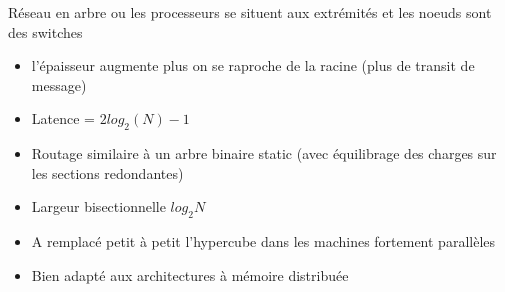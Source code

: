 \documentclass[12pt,a4paper,oneside, titlepage]{article}
\begin{document}
      Réseau en arbre ou les processeurs se situent aux extrémités et les noeuds sont des switches

      \begin{itemize}
        \item l'épaisseur augmente plus on se raproche de la racine (plus de transit de message)
        \item Latence = $2 log_2(N) - 1$
        \item Routage similaire à un arbre binaire static (avec équilibrage des charges sur les sections redondantes)
        \item Largeur bisectionnelle $log_2 N$
        \item A remplacé petit à petit l'hypercube dans les machines fortement parallèles
        \item Bien adapté aux architectures à mémoire distribuée
      \end{itemize}
\end{document}
